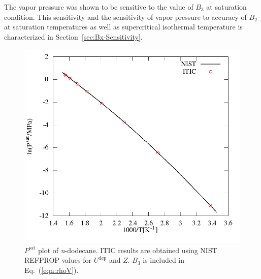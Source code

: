\documentclass[5p,times]{elsarticle}
\begin{document}
The vapor pressure was shown to be sensitive to the value of $B_3$ at saturation condition. This sensitivity and the sensitivity of vapor pressure to accuracy of $B_2$ at saturation temperatures as well as supercritical isothermal temperature is characterized in Section~\ref{sec:Bx-Sensitivity}.

\begin{figure} 
\includegraphics[scale=0.4]{Figures/NIST-VAL_FTT_psat.png}
\caption{$P^{\mathrm{sat}}$ plot of \textit{n}-dodecane. ITIC results are obtained using NIST REFPROP values \cite{Lemmon2004} for $U^{\mathrm{dep}}$ and $Z$. $B_3$ is included in Eq.~(\ref{eqn:rhoV}).}
\label{fig:NIST-VALIDATION_C12_FTT_Psat}
\end{figure}
\end{document}

